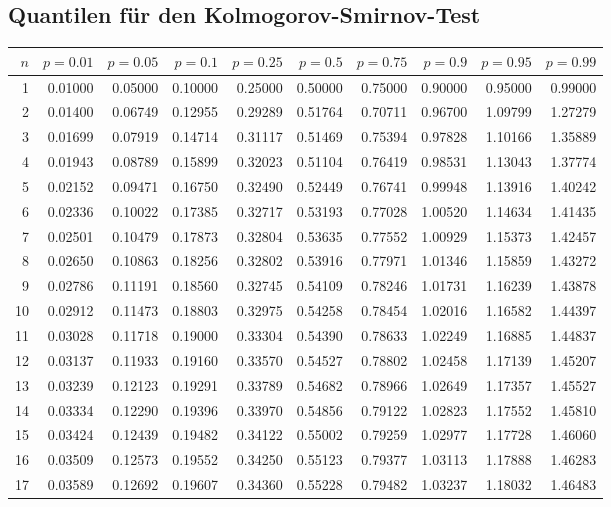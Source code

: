 	\subsection{Quantilen für den Kolmogorov-Smirnov-Test}
	\label{tabelle-quantilen-kstest}
	\begin{minipage}{18cm}
    	\centering
\begin{tabular}{|r|rrr|rrr|rrr|}
\hline
$n$&$p=0.01$&$p=0.05$&$p=0.1$&$p=0.25$&$p=0.5$&$p=0.75$&$p=0.9$&$p=0.95$&$p=0.99$\\
\hline
\rowcolor[gray]{.9}
1&0.01000&0.05000&0.10000&0.25000&0.50000&0.75000&0.90000&0.95000&0.99000\\
2&0.01400&0.06749&0.12955&0.29289&0.51764&0.70711&0.96700&1.09799&1.27279\\
\rowcolor[gray]{.9}
3&0.01699&0.07919&0.14714&0.31117&0.51469&0.75394&0.97828&1.10166&1.35889\\
4&0.01943&0.08789&0.15899&0.32023&0.51104&0.76419&0.98531&1.13043&1.37774\\
\rowcolor[gray]{.9}
5&0.02152&0.09471&0.16750&0.32490&0.52449&0.76741&0.99948&1.13916&1.40242\\
6&0.02336&0.10022&0.17385&0.32717&0.53193&0.77028&1.00520&1.14634&1.41435\\
\rowcolor[gray]{.9}
7&0.02501&0.10479&0.17873&0.32804&0.53635&0.77552&1.00929&1.15373&1.42457\\
8&0.02650&0.10863&0.18256&0.32802&0.53916&0.77971&1.01346&1.15859&1.43272\\
\rowcolor[gray]{.9}
9&0.02786&0.11191&0.18560&0.32745&0.54109&0.78246&1.01731&1.16239&1.43878\\
10&0.02912&0.11473&0.18803&0.32975&0.54258&0.78454&1.02016&1.16582&1.44397\\
\rowcolor[gray]{.9}
11&0.03028&0.11718&0.19000&0.33304&0.54390&0.78633&1.02249&1.16885&1.44837\\
12&0.03137&0.11933&0.19160&0.33570&0.54527&0.78802&1.02458&1.17139&1.45207\\
\rowcolor[gray]{.9}
13&0.03239&0.12123&0.19291&0.33789&0.54682&0.78966&1.02649&1.17357&1.45527\\
14&0.03334&0.12290&0.19396&0.33970&0.54856&0.79122&1.02823&1.17552&1.45810\\
\rowcolor[gray]{.9}
15&0.03424&0.12439&0.19482&0.34122&0.55002&0.79259&1.02977&1.17728&1.46060\\
16&0.03509&0.12573&0.19552&0.34250&0.55123&0.79377&1.03113&1.17888&1.46283\\
\rowcolor[gray]{.9}
17&0.03589&0.12692&0.19607&0.34360&0.55228&0.79482&1.03237&1.18032&1.46483\\

\end{tabular}
\end{minipage}
